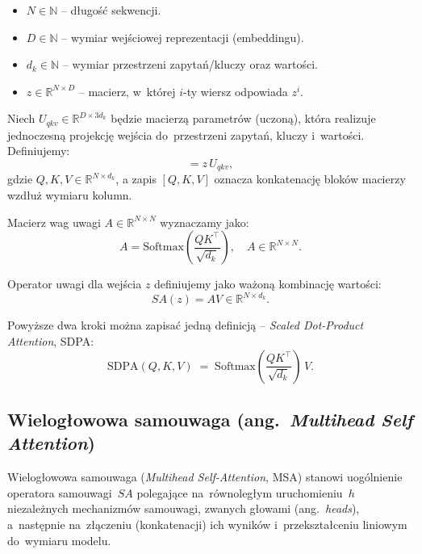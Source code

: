\documentclass[a4paper,11pt,twoside]{report}
\theoremstyle{definition}
\begin{document}
\begin{itemize}
  \item $N \in \mathbb{N}$ -- długość sekwencji.
  \item $D \in \mathbb{N}$ -- wymiar wejściowej reprezentacji (embeddingu).
  \item $d_k \in \mathbb{N}$ -- wymiar przestrzeni zapytań/kluczy oraz wartości.
  \item $z \in \mathbb{R}^{N \times D}$ -- macierz, w~której $i$-ty wiersz odpowiada $z^i$.
\end{itemize}

Niech $U_{qkv} \in \mathbb{R}^{D \times 3d_k}$ będzie macierzą parametrów (uczoną), która realizuje jednoczesną projekcję wejścia do~przestrzeni zapytań, kluczy i~wartości. Definiujemy:
\begin{equation}
[Q, K, V] = z\, U_{qkv},
\end{equation}
gdzie $Q,K,V \in \mathbb{R}^{N \times d_k}$, a zapis $[Q,K,V]$ oznacza konkatenację bloków macierzy wzdłuż wymiaru kolumn.

Macierz wag uwagi $A \in \mathbb{R}^{N \times N}$ wyznaczamy jako:
\begin{equation}
A = \mathrm{Softmax}\!\left(\frac{QK^\top}{\sqrt{d_k}}\right),
\quad A \in \mathbb{R}^{N \times N}.
\end{equation}

Operator uwagi dla wejścia $z$ definiujemy jako ważoną kombinację wartości:
\begin{equation}
SA(z) = AV \in \mathbb{R}^{N \times d_k}.
\end{equation}

Powyższe dwa kroki można zapisać jedną definicją -- \emph{Scaled Dot-Product Attention}, SDPA:
\begin{equation}
\mathrm{SDPA}(Q,K,V)
\;=\;
\mathrm{Softmax}\!\left(\frac{QK^\top}{\sqrt{d_k}}\right)\,V.
\end{equation}

\subsection{Wielogłowowa samouwaga (ang.\ \emph{Multihead Self Attention})}


Wielogłowowa samouwaga (\emph{Multihead Self-Attention}, MSA) stanowi uogólnienie operatora samouwagi~$SA$ polegające na~równoległym uruchomieniu~$h$ niezależnych mechanizmów samouwagi, zwanych głowami (ang.\ \emph{heads}), a~następnie na~złączeniu (konkatenacji) ich wyników i~przekształceniu liniowym do~wymiaru modelu.
\end{document}
